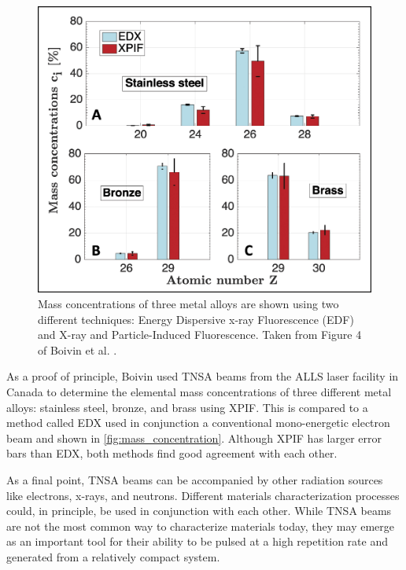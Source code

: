\begin{figure}
	\centering
	\includegraphics[width=0.6\linewidth]{planning/images/mass_concentration.jpg}
	\caption{Mass concentrations of three metal alloys are shown using two different techniques: Energy Dispersive x-ray Fluorescence (EDF) and X-ray and Particle-Induced Fluorescence. Taken from Figure 4 of Boivin et al. \cite{Boivin_2022_NJoP}.}
	\label{fig:mass_concentration}
\end{figure}

As a proof of principle, Boivin \cite{Boivin_2022_NJoP} used TNSA beams from the \gls{ALLS} laser facility in Canada to determine the elemental mass concentrations of three different metal alloys: stainless steel, bronze, and  brass using \gls{XPIF}. This is compared to a method called \gls{EDX} used in conjunction a conventional mono-energetic electron beam and shown in \autoref{fig:mass_concentration}. Although XPIF has larger error bars than \gls{EDX}, both methods find good agreement with each other.

As a final point, \gls{TNSA} beams can be accompanied by other radiation sources like electrons, x-rays, and neutrons. Different materials characterization processes could, in principle, be used in conjunction with each other. While \gls{TNSA} beams are not the most common way to characterize materials today, they may emerge as an important tool for their ability to be pulsed at a high repetition rate and generated from a relatively compact system.

